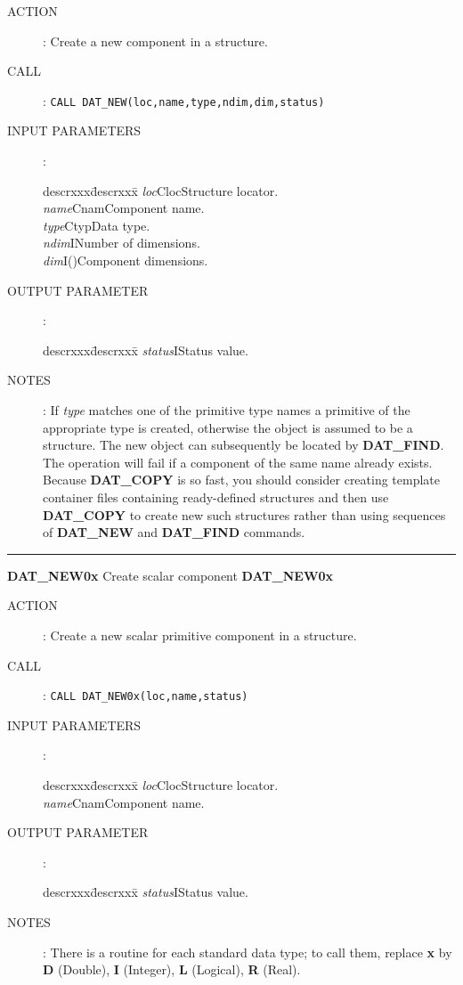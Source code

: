 \begin{description}
\item [ACTION]:
Create a new component in a structure.
\item [CALL]:
{\tt CALL DAT\_NEW(loc,name,type,ndim,dim,status)}
\item [INPUT PARAMETERS]:
\begin{tabbing}
descrxxx\=descrxxx\=\kill
{\em loc}\>Cloc\>Structure locator.\\
{\em name}\>Cnam\>Component name.\\
{\em type}\>Ctyp\>Data type.\\
{\em ndim}\>I\>Number of dimensions.\\
{\em dim}\>I()\>Component dimensions.
\end{tabbing}
\item [OUTPUT PARAMETER]:
\begin{tabbing}
descrxxx\=descrxxx\=\kill
{\em status}\>I\>Status value.
\end{tabbing}
\item [NOTES]:
If {\em type} matches one of the primitive type names a primitive of
the appropriate type is created, otherwise the object is assumed to be a
structure.
The new object can subsequently be located by {\bf DAT\_FIND}.
The operation will fail if a component of the same name already exists.
Because {\bf DAT\_COPY} is so fast, you should consider creating template
container files containing ready-defined structures and then use {\bf DAT\_COPY}
to create new such structures rather than using sequences of {\bf DAT\_NEW} and
{\bf DAT\_FIND} commands.
\end{description}
\goodbreak
\rule{\textwidth}{0.3mm}
{\Large {\bf DAT\_NEW0x} \hfill Create scalar component \hfill {\bf DAT\_NEW0x}}
\begin{description}
\item [ACTION]:
Create a new scalar primitive component in a structure.
\item [CALL]:
{\tt CALL DAT\_NEW0x(loc,name,status)}
\item [INPUT PARAMETERS]:
\begin{tabbing}
descrxxx\=descrxxx\=\kill
{\em loc}\>Cloc\>Structure locator.\\
{\em name}\>Cnam\>Component name.
\end{tabbing}
\item [OUTPUT PARAMETER]:
\begin{tabbing}
descrxxx\=descrxxx\=\kill
{\em status}\>I\>Status value.
\end{tabbing}
\item [NOTES]:
There is a routine for each standard data type; to call them, replace {\bf x}
by {\bf D} (Double), {\bf I} (Integer), {\bf L} (Logical), {\bf R} (Real).
\end{description}
